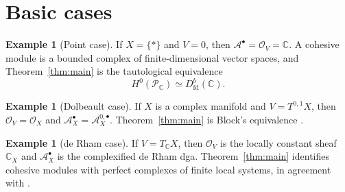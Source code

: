 \documentclass[12pt]{amsart}
\theoremstyle{definition}
\newtheorem{example}[thm]{Example}
\theoremstyle{remark}
\numberwithin{equation}{section}
\newcommand{\CA}{\mathcal A}
\newcommand{\CO}{\mathcal O}
\newcommand{\C}{\mathbb C}
\begin{document}
\section{Basic cases}

\begin{example}[Point case]
If \(X=\{*\}\) and \(V=0\), then
\(\CA^\bullet=\CO_V=\C\).  A cohesive module is a bounded complex of
finite-dimensional vector spaces, and Theorem~\ref{thm:main} is the
tautological equivalence
\[
H^0(\mathcal P_{\C})\simeq D^b_{\mathrm{fd}}(\C).
\]
\end{example}

\begin{example}[Dolbeault case]
If \(X\) is a complex manifold and \(V=T^{0,1}X\), then
\(\CO_V=\CO_X\) and \(\CA_X^\bullet=\CA_X^{0,\bullet}\).
Theorem~\ref{thm:main} is Block's equivalence
\cite[Theorem~4.3]{Block2010}.
\end{example}

\begin{example}[de Rham case]
If \(V=T_{\C}X\), then \(\CO_V\) is the locally constant sheaf \(\C_X\) and
\(\CA_X^\bullet\) is the complexified de Rham dga.  Theorem~\ref{thm:main}
identifies cohesive modules with perfect complexes of finite local systems,
in agreement with \cite[Theorem~8.1]{CHL2021}.
\end{example}
\end{document}
